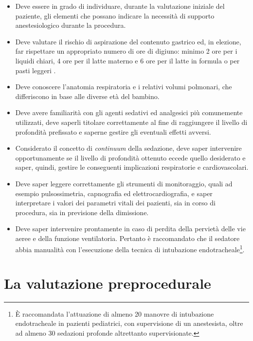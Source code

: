 \begin{itemize}
    \item Deve essere in grado di individuare, durante la valutazione iniziale del paziente, gli elementi che possano indicare la necessità di supporto anestesiologico durante la procedura.
    \item Deve valutare il rischio di aspirazione del contenuto gastrico ed, in elezione, far rispettare un appropriato numero di ore di digiuno: minimo 2 ore per i liquidi chiari, 4 ore per il latte materno e 6 ore per il latte in formula o per pasti leggeri \cite{Guidelines2019}. 
    \item Deve conoscere l'anatomia respiratoria e i relativi volumi polmonari, che differiscono in base alle diverse età del bambino. 
    \item Deve avere familiarità con gli agenti sedativi ed analgesici più comunemente utilizzati, deve saperli titolare correttamente al fine di raggiungere il livello di profondità prefissato e saperne gestire gli eventuali effetti avversi. 
    \item Considerato il concetto di \emph{continuum} della sedazione, deve saper intervenire opportunamente se il livello di profondità ottenuto eccede quello desiderato e saper, quindi, gestire le conseguenti implicazioni respiratorie e cardiovascolari. 
    \item Deve saper leggere correttamente gli strumenti di monitoraggio, quali ad esempio pulsossimetria, capnografia ed elettrocardiografia, e saper interpretare i valori dei parametri vitali dei pazienti, sia in corso di procedura, sia in previsione della dimissione. 
    \item Deve saper intervenire prontamente in caso di perdita della pervietà delle vie aeree e della funzione ventilatoria. Pertanto è raccomandato che il sedatore abbia manualità con l'esecuzione della tecnica di intubazione endotracheale\footnote{\`E raccomandata l'attuazione di almeno 20 manovre di intubazione endotracheale in pazienti pediatrici, con supervisione di un anestesista, oltre ad almeno 30 sedazioni profonde altrettanto supervisionate.}.
\end{itemize}

\newpage

\section{La valutazione preprocedurale}

